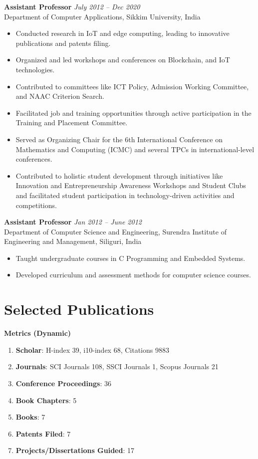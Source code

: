 \documentclass[10pt,a4paper]{article}
\begin{document}
	\textbf{Assistant Professor} \hfill \textit{July 2012 -- Dec 2020}\\
	Department of Computer Applications, Sikkim University, India
	\begin{itemize}[leftmargin=0.2in]
		\item Conducted research in IoT and edge computing, leading to innovative publications and patents filing.
		\item Organized and led workshops and conferences on Blockchain, and IoT technologies.
		\item Contributed to committees like ICT Policy, Admission Working Committee, and NAAC Criterion Search.
		\item Facilitated job and training opportunities through active participation in the Training and Placement Committee.
		\item Served as Organizing Chair for the 6th International Conference on Mathematics and Computing (ICMC) and several TPCs in international-level conferences.
		\item Contributed to holistic student development through initiatives like Innovation and Entrepreneurship Awareness Workshops and Student Clubs and facilitated student participation in technology-driven activities and competitions.
	\end{itemize}
	
	\textbf{Assistant Professor} \hfill \textit{Jan 2012 -- June 2012}\\
	Department of Computer Science and Engineering, Surendra Institute of Engineering and Management, Siliguri, India
	\begin{itemize}[leftmargin=0.2in]
		\item Taught undergraduate courses in C Programming and Embedded Systems.
		\item Developed curriculum and assessment methods for computer science courses.
	\end{itemize}
	
	\section*{Selected Publications}
	
	\textbf{Metrics (Dynamic)}
	\begin{enumerate}[leftmargin=0.2in]
		\item \textbf{Scholar}: H-index 39, i10-index 68, Citations 9883
		\item \textbf{Journals}: SCI Journals 108, SSCI Journals 1, Scopus Journals 21
		\item \textbf{Conference Proceedings}: 36
		\item \textbf{Book Chapters}: 5  
		\item \textbf{Books}: 7
		\item \textbf{Patents Filed}: 7
		\item \textbf{Projects/Dissertations Guided}: 17
	\end{enumerate}
	
\end{document}
